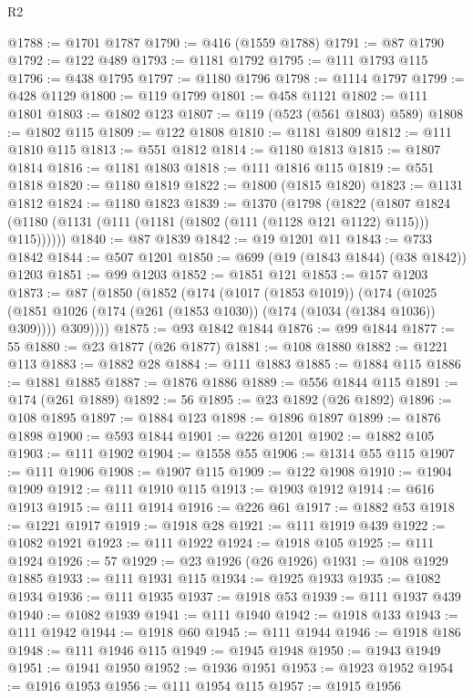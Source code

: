 \begin{lexlean}{R2}
\begin{coremodule}
@1788 := @1701 @1787
@1790 := @416 (@1559 @1788)
@1791 := @87 @1790
@1792 := @122 @489
@1793 := @1181 @1792
@1795 := @111 @1793 @115
@1796 := @438 @1795
@1797 := @1180 @1796
@1798 := @1114 @1797
@1799 := @428 @1129
@1800 := @119 @1799
@1801 := @458 @1121
@1802 := @111 @1801
@1803 := @1802 @123
@1807 := @119 (@523 (@561 @1803) @589)
@1808 := @1802 @115
@1809 := @122 @1808
@1810 := @1181 @1809
@1812 := @111 @1810 @115
@1813 := @551 @1812
@1814 := @1180 @1813
@1815 := @1807 @1814
@1816 := @1181 @1803
@1818 := @111 @1816 @115
@1819 := @551 @1818
@1820 := @1180 @1819
@1822 := @1800 (@1815 @1820)
@1823 := @1131 @1812
@1824 := @1180 @1823
@1839 := @1370
    (@1798
      (@1822
        (@1807 @1824 (@1180 (@1131 (@111 (@1181 (@1802 (@111 (@1128 @121 @1122) @115))) @115))))))
@1840 := @87 @1839
@1842 := @19 @1201 @11
@1843 := @733 @1842
@1844 := @507 @1201
@1850 := @699 (@19 (@1843 @1844) (@38 @1842)) @1203
@1851 := @99 @1203
@1852 := @1851 @121
@1853 := @157 @1203
@1873 := @87
    (@1850
      (@1852
        (@174
          (@1017 (@1853 @1019))
          (@174
            (@1025 (@1851 @1026 (@174 (@261 (@1853 @1030)) (@174 (@1034 (@1384 @1036)) @309))))
            @309))))
@1875 := @93 @1842 @1844
@1876 := @99 @1844
@1877 := 55
@1880 := @23 @1877 (@26 @1877)
@1881 := @108 @1880
@1882 := @1221 @113
@1883 := @1882 @28
@1884 := @111 @1883
@1885 := @1884 @115
@1886 := @1881 @1885
@1887 := @1876 @1886
@1889 := @556 @1844 @115
@1891 := @174 (@261 @1889)
@1892 := 56
@1895 := @23 @1892 (@26 @1892)
@1896 := @108 @1895
@1897 := @1884 @123
@1898 := @1896 @1897
@1899 := @1876 @1898
@1900 := @593 @1844
@1901 := @226 @1201
@1902 := @1882 @105
@1903 := @111 @1902
@1904 := @1558 @55
@1906 := @1314 @55 @115
@1907 := @111 @1906
@1908 := @1907 @115
@1909 := @122 @1908
@1910 := @1904 @1909
@1912 := @111 @1910 @115
@1913 := @1903 @1912
@1914 := @616 @1913
@1915 := @111 @1914
@1916 := @226 @61
@1917 := @1882 @53
@1918 := @1221 @1917
@1919 := @1918 @28
@1921 := @111 @1919 @439
@1922 := @1082 @1921
@1923 := @111 @1922
@1924 := @1918 @105
@1925 := @111 @1924
@1926 := 57
@1929 := @23 @1926 (@26 @1926)
@1931 := @108 @1929 @1885
@1933 := @111 @1931 @115
@1934 := @1925 @1933
@1935 := @1082 @1934
@1936 := @111 @1935
@1937 := @1918 @53
@1939 := @111 @1937 @439
@1940 := @1082 @1939
@1941 := @111 @1940
@1942 := @1918 @133
@1943 := @111 @1942
@1944 := @1918 @60
@1945 := @111 @1944
@1946 := @1918 @186
@1948 := @111 @1946 @115
@1949 := @1945 @1948
@1950 := @1943 @1949
@1951 := @1941 @1950
@1952 := @1936 @1951
@1953 := @1923 @1952
@1954 := @1916 @1953
@1956 := @111 @1954 @115
@1957 := @1915 @1956

\end{coremodule}
\end{lexlean}
